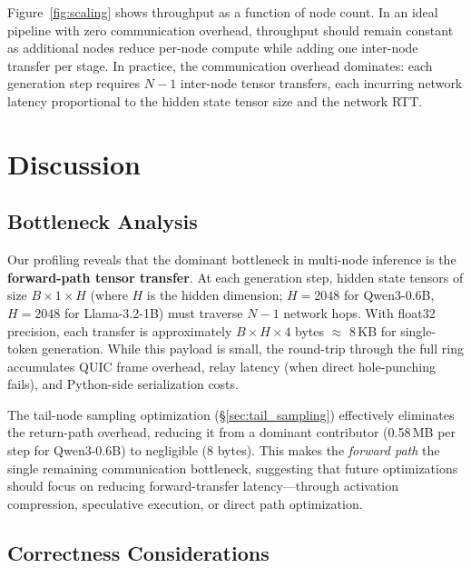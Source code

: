 \documentclass[runningheads]{llncs}
\begin{document}
Figure~\ref{fig:scaling} shows throughput as a function of node count. In an ideal pipeline with zero communication overhead, throughput should remain constant as additional nodes reduce per-node compute while adding one inter-node transfer per stage. In practice, the communication overhead dominates: each generation step requires $N\!-\!1$ inter-node tensor transfers, each incurring network latency proportional to the hidden state tensor size and the network RTT.

\section{Discussion}
\label{sec:discussion}

\subsection{Bottleneck Analysis}
\label{sec:bottleneck}

Our profiling reveals that the dominant bottleneck in multi-node inference is the \textbf{forward-path tensor transfer}. At each generation step, hidden state tensors of size $B \times 1 \times H$ (where $H$ is the hidden dimension; $H=2048$ for Qwen3-0.6B, $H=2048$ for Llama-3.2-1B) must traverse $N\!-\!1$ network hops. With float32 precision, each transfer is approximately $B \times H \times 4$ bytes $\approx$ 8\,KB for single-token generation. While this payload is small, the round-trip through the full ring accumulates QUIC frame overhead, relay latency (when direct hole-punching fails), and Python-side serialization costs.

The tail-node sampling optimization (\S\ref{sec:tail_sampling}) effectively eliminates the return-path overhead, reducing it from a dominant contributor (0.58\,MB per step for Qwen3-0.6B) to negligible (8 bytes). This makes the \emph{forward path} the single remaining communication bottleneck, suggesting that future optimizations should focus on reducing forward-transfer latency---through activation compression, speculative execution, or direct path optimization.

\subsection{Correctness Considerations}
\label{sec:correctness}
\end{document}

